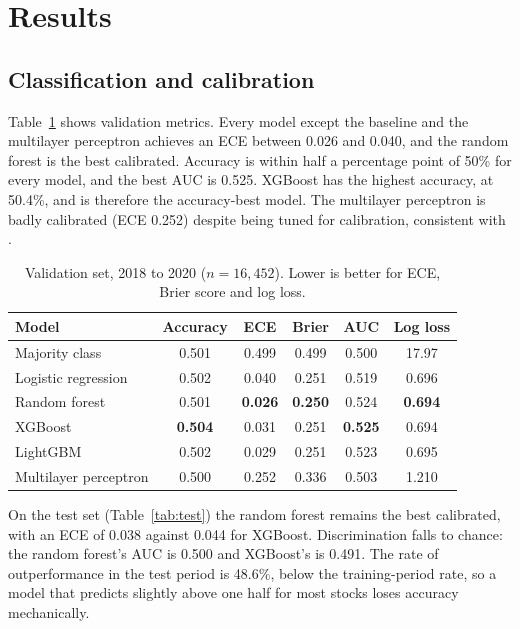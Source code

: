 \documentclass[11pt,a4paper]{article}
\begin{document}
\section{Results}

\subsection{Classification and calibration}

Table~\ref{tab:val} shows validation metrics. Every model except the baseline and the multilayer perceptron achieves an ECE between 0.026 and 0.040, and the random forest is the best calibrated. Accuracy is within half a percentage point of 50\% for every model, and the best AUC is 0.525. XGBoost has the highest accuracy, at 50.4\%, and is therefore the accuracy-best model. The multilayer perceptron is badly calibrated (ECE 0.252) despite being tuned for calibration, consistent with \citet{guo2017}.

\begin{table}[t]
\centering\small
\caption{Validation set, 2018 to 2020 ($n=16{,}452$). Lower is better for ECE, Brier score and log loss.}
\label{tab:val}
\begin{tabular}{@{}lccccc@{}}
\toprule
Model & Accuracy & ECE & Brier & AUC & Log loss \\
\midrule
Majority class & 0.501 & 0.499 & 0.499 & 0.500 & 17.97 \\
Logistic regression & 0.502 & 0.040 & 0.251 & 0.519 & 0.696 \\
Random forest & 0.501 & \textbf{0.026} & \textbf{0.250} & 0.524 & \textbf{0.694} \\
XGBoost & \textbf{0.504} & 0.031 & 0.251 & \textbf{0.525} & 0.694 \\
LightGBM & 0.502 & 0.029 & 0.251 & 0.523 & 0.695 \\
Multilayer perceptron & 0.500 & 0.252 & 0.336 & 0.503 & 1.210 \\
\bottomrule
\end{tabular}
\end{table}

On the test set (Table~\ref{tab:test}) the random forest remains the best calibrated, with an ECE of 0.038 against 0.044 for XGBoost. Discrimination falls to chance: the random forest's AUC is 0.500 and XGBoost's is 0.491. The rate of outperformance in the test period is 48.6\%, below the training-period rate, so a model that predicts slightly above one half for most stocks loses accuracy mechanically.
\end{document}
